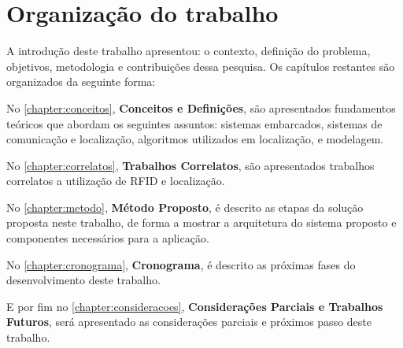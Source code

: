 \begin{comment}
\section{Metodologia Proposta}

\section{Contribuições propostas}
As contribuições propostas deste trabalho são:
\begin{enumerate}
    \item A implementação de um sistema para localização de objetos. O Metódo utilizado visa localizar objeto sem alta precisão, porém é viável para controle de acervos.
    \item O sistema desevolvido pode auxiliar no controle e ainda facilitar o levantamento de todos os bens do proprietário.
\end{enumerate}

\end{comment}


\section{Organização do trabalho}
A introdução deste trabalho apresentou: o contexto, definição do problema, objetivos, metodologia e contribuições 
dessa pesquisa. Os capítulos restantes são organizados da seguinte forma:

No \autoref{chapter:conceitos}, \textbf{Conceitos e Definições}, são apresentados fundamentos teóricos que abordam os 
seguintes assuntos: sistemas embarcados, sistemas de comunicação e localização, algoritmos utilizados em localização, e modelagem.

\par
No \autoref{chapter:correlatos}, \textbf{Trabalhos Correlatos}, são apresentados trabalhos correlatos a utilização de RFID e localização.

\par
No \autoref{chapter:metodo}, \textbf{Método Proposto}, é descrito as etapas da solução proposta neste trabalho, de 
forma a mostrar a arquitetura do sistema proposto e componentes necessários para a aplicação.

\par
No \autoref{chapter:cronograma}, \textbf{Cronograma}, é descrito as próximas fases do desenvolvimento deste trabalho.

\par
E por fim no \autoref{chapter:consideracoes}, \textbf{Considerações Parciais e Trabalhos Futuros}, será apresentado as 
considerações parciais e próximos passo deste trabalho.
